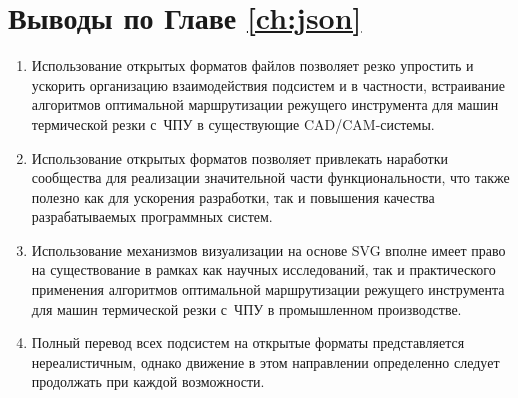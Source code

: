 
\section{Выводы по Главе \ref{ch:json}}
\label{sec:json.conclude}

\begin{enumerate}
  \item
  Использование открытых форматов файлов
  позволяет резко упростить и ускорить
  организацию взаимодействия подсистем
  и в частности,
  встраивание алгоритмов оптимальной маршрутизации
  режущего инструмента для машин термической
  резки с~ЧПУ в существующие
  CAD/CAM-системы.
  \item
  Использование открытых форматов
  позволяет привлекать наработки
  сообщества для реализации
  значительной части функциональности,
  что также полезно как для ускорения
  разработки,
  так и повышения качества разрабатываемых
  программных систем.
  \item
  Использование механизмов визуализации
  на основе SVG вполне имеет право на существование
  в рамках как научных исследований,
  так и практического применения
  алгоритмов оптимальной маршрутизации
  режущего инструмента для машин термической
  резки с~ЧПУ
  в промышленном производстве.
  \item
  Полный перевод всех подсистем на открытые
  форматы представляется нереалистичным,
  однако движение в этом направлении
  определенно следует продолжать
  при каждой возможности.
\end{enumerate}
